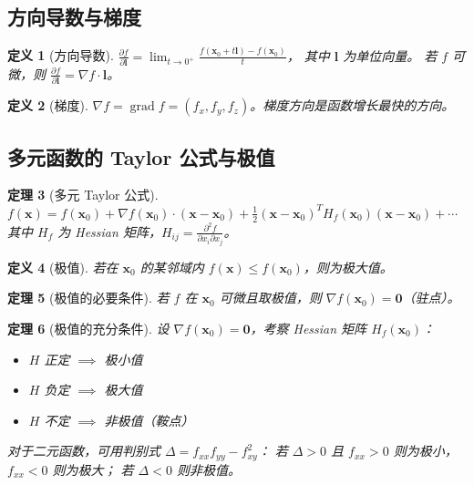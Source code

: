 \documentclass[12pt,a4paper]{ctexart}
\newtheorem{theorem}{定理}[section]
\newtheorem{definition}[theorem]{定义}
\theoremstyle{remark}
\begin{document}
\subsection{方向导数与梯度}

\begin{definition}[方向导数]
$\frac{\partial f}{\partial \mathbf{l}} = \lim_{t\to 0^+} \frac{f(\mathbf{x}_0+t\mathbf{l})-f(\mathbf{x}_0)}{t}$，
其中 $\mathbf{l}$ 为单位向量。
若 $f$ 可微，则 $\frac{\partial f}{\partial \mathbf{l}} = \nabla f \cdot \mathbf{l}$。
\end{definition}

\begin{definition}[梯度]
$\nabla f = \operatorname{grad} f = (f_x, f_y, f_z)$。梯度方向是函数增长最快的方向。
\end{definition}

\subsection{多元函数的 Taylor 公式与极值}

\begin{theorem}[多元 Taylor 公式]
$f(\mathbf{x}) = f(\mathbf{x}_0) + \nabla f(\mathbf{x}_0) \cdot (\mathbf{x}-\mathbf{x}_0)
+ \frac{1}{2}(\mathbf{x}-\mathbf{x}_0)^T H_f(\mathbf{x}_0)(\mathbf{x}-\mathbf{x}_0) + \cdots$
其中 $H_f$ 为 Hessian 矩阵，$H_{ij} = \frac{\partial^2 f}{\partial x_i \partial x_j}$。
\end{theorem}

\begin{definition}[极值]
若在 $\mathbf{x}_0$ 的某邻域内 $f(\mathbf{x}) \le f(\mathbf{x}_0)$，则为极大值。
\end{definition}

\begin{theorem}[极值的必要条件]
若 $f$ 在 $\mathbf{x}_0$ 可微且取极值，则 $\nabla f(\mathbf{x}_0) = \mathbf{0}$（驻点）。
\end{theorem}

\begin{theorem}[极值的充分条件]
设 $\nabla f(\mathbf{x}_0) = \mathbf{0}$，考察 Hessian 矩阵 $H_f(\mathbf{x}_0)$：
\begin{itemize}
  \item $H$ 正定 $\implies$ 极小值
  \item $H$ 负定 $\implies$ 极大值
  \item $H$ 不定 $\implies$ 非极值（鞍点）
\end{itemize}
对于二元函数，可用判别式 $\Delta = f_{xx}f_{yy} - f_{xy}^2$：
若 $\Delta > 0$ 且 $f_{xx} > 0$ 则为极小，$f_{xx} < 0$ 则为极大；
若 $\Delta < 0$ 则非极值。
\end{theorem}
\end{document}
